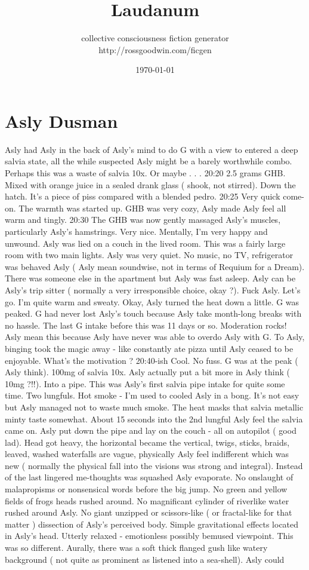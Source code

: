 \documentclass[12pt]{book}
\title{Laudanum}
\author{collective consciousness fiction generator\\http://rossgoodwin.com/ficgen}
\date{\today}
\begin{document}
\maketitle



\chapter{Asly Dusman}

Asly had Asly in the back of Asly's mind to do G with a view to entered a deep salvia state, all the while suspected Asly might be a barely worthwhile combo. Perhaps this was a waste of salvia 10x. Or maybe . . .  20:20 2.5 grams GHB. Mixed with orange juice in a sealed drank glass ( shook, not stirred). Down the hatch. It's a piece of piss compared with a blended pedro. 20:25 Very quick come-on. The warmth was started up. GHB was very cozy, Asly made Asly feel all warm and tingly. 20:30 The GHB was now gently massaged Asly's muscles, particularly Asly's hamstrings. Very nice. Mentally, I'm very happy and unwound. Asly was lied on a couch in the lived room. This was a fairly large room with two main lights. Asly was very quiet. No music, no TV, refrigerator was behaved Asly ( Asly mean soundwise, not in terms of Requium for a Dream). There was someone else in the apartment but Asly was fast asleep. Asly can be Asly's trip sitter ( normally a very irresponsible choice, okay ?). Fuck Asly. Let's go. I'm quite warm and sweaty. Okay, Asly turned the heat down a little. G was peaked. G had never lost Asly's touch because Asly take month-long breaks with no hassle. The last G intake before this was 11 days or so. Moderation rocks! Asly mean this because Asly have never was able to overdo Asly with G. To Asly, binging took the magic away - like constantly ate pizza until Asly ceased to be enjoyable. What's the motivation ? 20:40-ish Cool. No fuss. G was at the peak ( Asly think). 100mg of salvia 10x. Asly actually put a bit more in Asly think ( 10mg ?!!). Into a pipe. This was Asly's first salvia pipe intake for quite some time. Two lungfuls. Hot smoke - I'm used to cooled Asly in a bong. It's not easy but Asly managed not to waste much smoke. The heat masks that salvia metallic minty taste somewhat. About 15 seconds into the 2nd lungful Asly feel the salvia came on. Asly put down the pipe and lay on the couch - all on autopilot ( good lad). Head got heavy, the horizontal became the vertical, twigs, sticks, braids, leaved, washed waterfalls are vague, physically Asly feel indifferent which was new ( normally the physical fall into the visions was strong and integral). Instead of the last lingered me-thoughts was squashed Asly evaporate. No onslaught of malapropisms or nonsensical words before the big jump. No green and yellow fields of frogs heads rushed around. No magnificant cylinder of riverlike water rushed around Asly. No giant unzipped or scissors-like ( or fractal-like for that matter ) dissection of Asly's perceived body. Simple gravitational effects located in Asly's head. Utterly relaxed - emotionless possibly bemused viewpoint. This was so different. Aurally, there was a soft thick flanged gush like watery background ( not quite as prominent as listened into a sea-shell). Asly could 
\end{document}
